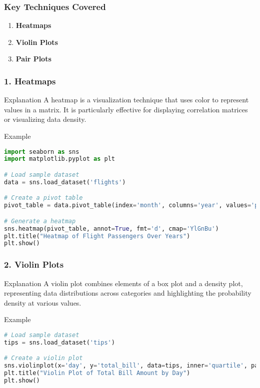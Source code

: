\documentclass{beamer}
\begin{document}
\begin{frame}[fragile]
    \frametitle{Key Techniques Covered}
    \begin{enumerate}
        \item \textbf{Heatmaps}
        \item \textbf{Violin Plots}
        \item \textbf{Pair Plots}
    \end{enumerate}
\end{frame}

\begin{frame}[fragile]
    \frametitle{1. Heatmaps}
    \begin{block}{Explanation}
        A heatmap is a visualization technique that uses color to represent values in a matrix. It is particularly effective for displaying correlation matrices or visualizing data density.
    \end{block}
    \begin{block}{Example}
        \begin{lstlisting}[language=Python]
import seaborn as sns
import matplotlib.pyplot as plt

# Load sample dataset
data = sns.load_dataset('flights')

# Create a pivot table
pivot_table = data.pivot_table(index='month', columns='year', values='passengers', aggfunc='sum')

# Generate a heatmap
sns.heatmap(pivot_table, annot=True, fmt='d', cmap='YlGnBu')
plt.title("Heatmap of Flight Passengers Over Years")
plt.show()
        \end{lstlisting}
    \end{block}
\end{frame}

\begin{frame}[fragile]
    \frametitle{2. Violin Plots}
    \begin{block}{Explanation}
        A violin plot combines elements of a box plot and a density plot, representing data distributions across categories and highlighting the probability density at various values.
    \end{block}
    \begin{block}{Example}
        \begin{lstlisting}[language=Python]
# Load sample dataset
tips = sns.load_dataset('tips')

# Create a violin plot
sns.violinplot(x='day', y='total_bill', data=tips, inner='quartile', palette='muted')
plt.title("Violin Plot of Total Bill Amount by Day")
plt.show()
        \end{lstlisting}
    \end{block}
\end{frame}
\end{document}
